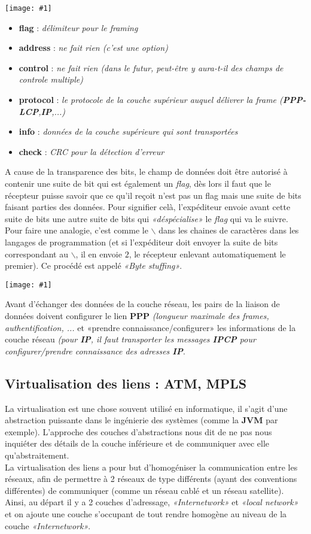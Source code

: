 \documentclass{article}
\newcommand{\imgR}[2]{\begin{center}\texttt{[image: \#1]}\end{center}}
\newcommand{\bfp}[2]{\item \textbf{#1} : \textit{#2}}
\begin{document}
\imgR{CN_129.png}{300}
\begin{itemize}
\bfp{flag}{délimiteur pour le framing}
\bfp{address}{ne fait rien (c'est une option)}
\bfp{control}{ne fait rien (dans le futur, peut-être y aura-t-il des champs de controle multiple)}
\bfp{protocol}{le protocole de la couche supérieur auquel délivrer la frame (\textbf{PPP-LCP},\textbf{IP},...)}
\bfp{info}{données de la couche supérieure qui sont transportées}
\bfp{check}{CRC pour la détection d'erreur}
\end{itemize}

\noindent A cause de la transparence des bits, le champ de données doit être autorisé à contenir une suite de bit 
qui est également un \textit{flag}, dès lors il faut que le récepteur puisse savoir que ce qu'il reçoit n'est pas 
un flag mais une suite de bits faisant parties des données. Pour signifier celà, l'expéditeur envoie avant cette 
suite de bits une autre suite de bits qui \textit{«déspécialise»} le \textit{flag} qui va le suivre. Pour faire 
une analogie, c'est comme le $\backslash$ dans les chaines de caractères dans les langages de programmation (et 
si l'expéditeur doit envoyer la suite de bits correspondant au $\backslash$, il en envoie $2$, le récepteur 
enlevant automatiquement le premier). Ce procédé est appelé \textit{«Byte stuffing»}.

\imgR{CN_130.png}{225}

Avant d'échanger des données de la couche réseau, les pairs de la liaison de données doivent configurer le lien 
\textbf{PPP} \textit{(longueur maximale des frames, authentification, ...} et «prendre connaissance/configurer» 
les informations de la couche réseau \textit{(pour \textbf{IP}, il faut transporter les messages \textbf{IPCP} 
pour configurer/prendre connaissance des adresses \textbf{IP}}.

\subsection{Virtualisation des liens : ATM, MPLS}

La virtualisation est une chose souvent utilisé en informatique, il s'agit d'une abstraction puissante dans le 
ingénierie des systèmes (comme la \textbf{JVM} par exemple). L'approche des couches d'abstractions nous dit de ne 
pas nous inquiéter des détails de la couche inférieure et de communiquer avec elle qu'abstraitement. \\

La virtualisation des liens a pour but d'homogéniser la communication entre les réseaux, afin de permettre à 2 
réseaux de type différents (ayant des conventions différentes) de communiquer (comme un réseau cablé et un réseau 
satellite). Ainsi, au départ il y a 2 couches d'adressage, \textit{«Internetwork»} et \textit{«local network»} et
on ajoute une couche s'occupant de tout rendre homogène au niveau de la couche \textit{«Internetwork»}. 
\end{document}

